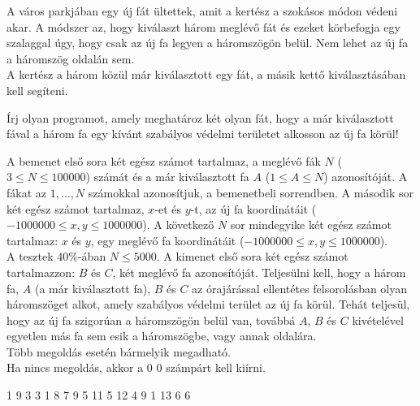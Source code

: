 





A város parkjában egy új fát ültettek, amit a kertész a szokásos módon védeni akar. A módszer az, hogy kiválaszt három meglévő fát és ezeket körbefogja egy szalaggal úgy, hogy csak az új fa legyen a háromszögön belül. Nem lehet az új fa a háromszög oldalán sem.\\
A kertész a három közül már kiválasztott egy fát, a másik kettő kiválasztásában kell segíteni.

Írj olyan programot, amely meghatároz két olyan fát, hogy a már kiválasztott fával a három fa egy kívánt szabályos védelmi területet alkosson az új fa körül!

A bemenet első sora két egész számot tartalmaz, a meglévő fák $N$ ($3 \leq N \leq 100000$) számát és a már kiválasztott fa $A$ ($1 \leq A \leq N$) azonosítóját. A fákat az $1,\ldots,N$ számokkal azonosítjuk, a bemenetbeli sorrendben. A második sor két egész számot tartalmaz, $x$-et és $y$-t, az új fa koordinátáit ($-1000000 \leq x,y \leq 1000000$). A következő $N$ sor mindegyike két egész számot tartalmaz: $x$ és $y$, egy meglévő fa koordinátáit ($-1000000 \leq x,y \leq 1000000$).\\
\smallskip
\noindent A tesztek $40 \%$-ában $N \leq 5000$.
A kimenet első sora két egész számot tartalmazzon: $B$ és $C$, két meglévő fa azonosítóját. Teljesülni kell, hogy a három fa, $A$ (a már kiválasztott fa), $B$ és $C$ az órajárással ellentétes felsorolásban olyan háromszöget alkot, amely szabályos védelmi terület az új fa körül. Tehát teljesül, hogy az új fa szigorúan a háromszögön belül van, továbbá $A$, $B$ és $C$ kivételével egyetlen más fa sem esik a háromszögbe, vagy annak oldalára.\\
Több megoldás esetén bármelyik megadható.\\
Ha nincs megoldás, akkor a $0\,\, 0$ számpárt kell kiírni.


 1
9 3
3 1
8 7
9 5
11 5
12 4
9 1
13 6
 6
\sampleCOMMENT

\sampleEND
\bigskip


